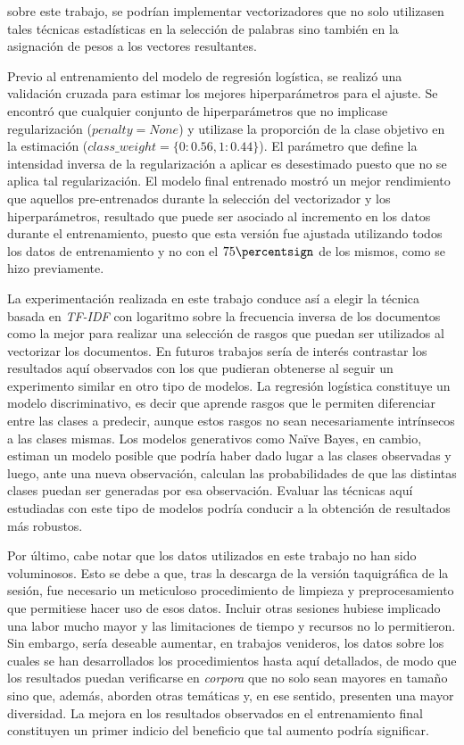 sobre este trabajo, se podr\'ian implementar vectorizadores que
no solo utilizasen tales t\'ecnicas estad\'isticas en la selecci\'on
de palabras sino tambi\'en en la asignaci\'on de pesos a los vectores resultantes.
\par
Previo al entrenamiento del modelo de regresi\'on log\'istica, se
realiz\'o una validaci\'on cruzada para estimar los mejores hiperpar\'ametros
para el ajuste. Se encontr\'o que cualquier conjunto de hiperpar\'ametros
que no implicase regularizaci\'on ($penalty=None$) y utilizase
la proporci\'on de la clase objetivo en la estimaci\'on
($class\_weight=\lbrace0:0.56, 1:0.44\rbrace$). El par\'ametro que define
la intensidad inversa de la regularizaci\'on a aplicar es desestimado
puesto que no se aplica tal regularizaci\'on. El modelo final entrenado
mostr\'o un mejor rendimiento que aquellos pre-entrenados
durante la selecci\'on del vectorizador y los hiperpar\'ametros, resultado que
puede ser asociado al incremento en los datos durante el entrenamiento,
puesto que esta versi\'on fue ajustada utilizando todos los datos
de entrenamiento y no con el $75\percentsign$ de los mismos,
como se hizo previamente.
\par
La experimentaci\'on realizada en este trabajo conduce as\'i a elegir
la t\'ecnica basada en \textit{TF-IDF} con logaritmo sobre la
frecuencia inversa de los documentos como la mejor para
realizar una selecci\'on de rasgos que puedan ser utilizados al
vectorizar los documentos. En futuros trabajos ser\'ia de inter\'es
contrastar los resultados aqu\'i observados con los que pudieran obtenerse
al seguir un experimento similar en otro tipo de modelos.
La regresi\'on log\'istica constituye un modelo discriminativo, es decir
que aprende rasgos que le permiten diferenciar entre las clases
a predecir, aunque estos rasgos no sean necesariamente intr\'insecos
a las clases mismas. Los modelos generativos como Naïve Bayes, en cambio, estiman un
modelo posible que podr\'ia haber dado lugar a las clases observadas y
luego, ante una nueva observaci\'on, calculan las probabilidades de que
las distintas clases puedan ser generadas por esa observaci\'on.
Evaluar las t\'ecnicas aqu\'i estudiadas con este tipo de modelos podr\'ia
conducir a la obtenci\'on de resultados m\'as robustos.
\par
Por \'ultimo, cabe notar que los datos utilizados en este trabajo
no han sido voluminosos. Esto se debe a que, tras la descarga
de la versi\'on taquigr\'afica de la sesi\'on, fue necesario un
meticuloso procedimiento de limpieza y preprocesamiento que permitiese
hacer uso de esos datos. Incluir otras sesiones hubiese implicado
una labor mucho mayor y las limitaciones de tiempo y recursos no
lo permitieron. Sin embargo, ser\'ia deseable aumentar, en trabajos
venideros, los datos sobre los cuales se han desarrollados los procedimientos
hasta aqu\'i detallados, de modo que los resultados puedan verificarse en
\textit{corpora} que no solo sean mayores en tamaño sino que, adem\'as,
aborden otras tem\'aticas y, en ese sentido, presenten una mayor
diversidad. La mejora en los resultados observados en el entrenamiento
final constituyen un primer indicio del beneficio que tal aumento podr\'ia
significar.